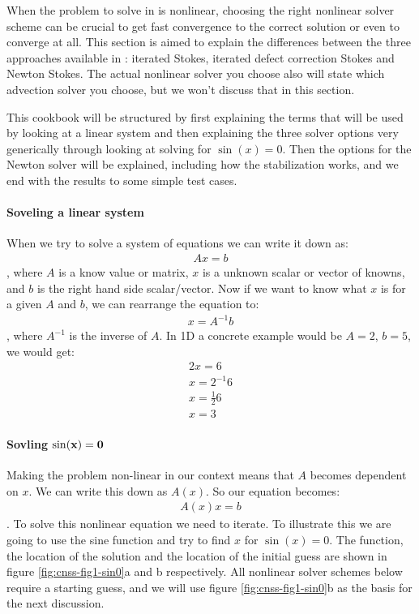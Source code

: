 When the problem to solve in \aspect{} is nonlinear, choosing the right nonlinear 
solver scheme can be crucial to get fast convergence to the correct solution or  
even to converge at all. This section is aimed to explain the differences between 
the three approaches available in \aspect{}: iterated Stokes, iterated defect correction
Stokes and Newton Stokes. The actual nonlinear solver you choose also will state 
which advection solver you choose, but we won't discuss that in this section.

This cookbook will be structured by first explaining the terms that will be used by looking 
at a linear system and then explaining the three solver options very 
generically through looking at solving for $\sin(x)=0$. Then the options for the Newton
solver will be explained, including how the stabilization works, and we end with 
the results to some simple test cases.

\paragraph{Soveling a linear system}

When we try to solve a system of equations we can write it down as:
\begin{align}
    \label{sec:cnss:eq1:axb}
    A x = b
\end{align}, where $A$ is a know value or matrix, $x$ is a unknown scalar or vector of
 knowns, and $b$ is the right hand side scalar/vector. Now if we want to know what $x$ is 
 for a given $A$ and $b$, we can rearrange the equation to:
\begin{align}
    x = A^{-1} b
\end{align}, where $A^{-1}$ is the inverse of $A$. In 1D a concrete example would be $A=2$,
$b=5$, we would get:
\begin{align}
    2 x = 6 \\
    x = 2^{-1} 6 \\
    x = \frac{1}{2} 6 \\
    x = 3
\end{align}

\paragraph{Sovling $\bf \sin(x)=0$}

Making the problem non-linear in our context means that $A$ becomes dependent on $x$. We 
can write this down as $A(x)$. So our equation becomes:
\begin{align}
    \label{sec:cnss:eq1:axxb}
    A(x) x = b
\end{align}. To solve this nonlinear equation we need to iterate. To illustrate this we are
going to use the sine function and try to find $x$ for $\sin(x)=0$. The function, the location of
the solution and the location of the initial guess are shown in figure \ref{fig:cnss-fig1-sin0}a 
and b respectively. All nonlinear solver schemes below require a starting guess, and we will use 
figure \ref{fig:cnss-fig1-sin0}b as the basis for the next discussion.

